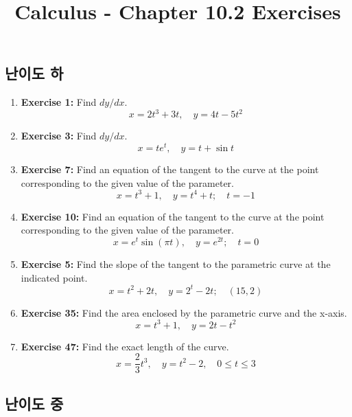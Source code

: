 \documentclass[12pt, a4paper]{article}
\title{Calculus - Chapter 10.2 Exercises}
\author{}
\date{}
\begin{document}
\maketitle
\hrulefill
\vspace{1em}

\subsection*{난이도 하}

\begin{enumerate}
    \item \textbf{Exercise 1:} Find $dy/dx$.
    \[ x = 2t^3+3t, \quad y = 4t - 5t^2 \]
    
    \item \textbf{Exercise 3:} Find $dy/dx$.
    \[ x = te^t, \quad y = t + \sin t \]
    
    \item \textbf{Exercise 7:} Find an equation of the tangent to the curve at the point corresponding to the given value of the parameter.
    \[ x = t^3+1, \quad y = t^4+t; \quad t = -1 \]
    
    \item \textbf{Exercise 10:} Find an equation of the tangent to the curve at the point corresponding to the given value of the parameter.
    \[ x = e^t \sin(\pi t), \quad y = e^{2t}; \quad t=0 \]
    
    \item \textbf{Exercise 5:} Find the slope of the tangent to the parametric curve at the indicated point.
    \[ x=t^2+2t, \quad y=2^t-2t; \quad (15, 2) \]
    
    \item \textbf{Exercise 35:} Find the area enclosed by the parametric curve and the x-axis.
    \[ x = t^3+1, \quad y = 2t - t^2 \]
    
    \item \textbf{Exercise 47:} Find the exact length of the curve.
    \[ x = \frac{2}{3}t^3, \quad y = t^2 - 2, \quad 0 \le t \le 3 \]
\end{enumerate}

\hrulefill
\vspace{1em}

\subsection*{난이도 중}
\end{document}
